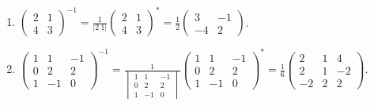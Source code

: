 	\paragraph{} %
		\begin{enumerate}
			\item %
			      $\begin{pmatrix}
					      2 & 1 \\
					      4 & 3
				      \end{pmatrix}^{-1} = \frac{1}{|2\ 1|} \begin{pmatrix}
					      2 & 1 \\
					      4 & 3
				      \end{pmatrix}^{*} = \frac{1}{2} \begin{pmatrix}
					      3  & -1 \\
					      -4 & 2
				      \end{pmatrix}$.

			\item %
			      $\begin{pmatrix}
					      1 & 1  & -1 \\
					      0 & 2  & 2  \\
					      1 & -1 & 0
				      \end{pmatrix}^{-1} = \frac{1}{\begin{vmatrix}
						      1 & 1  & -1 \\
						      0 & 2  & 2  \\
						      1 & -1 & 0
					      \end{vmatrix}} \begin{pmatrix}
					      1 & 1  & -1 \\
					      0 & 2  & 2  \\
					      1 & -1 & 0
				      \end{pmatrix}^{*} = \frac{1}{6} \begin{pmatrix}
					      2  & 1 & 4  \\
					      2  & 1 & -2 \\
					      -2 & 2 & 2
				      \end{pmatrix}$.
		\end{enumerate}


